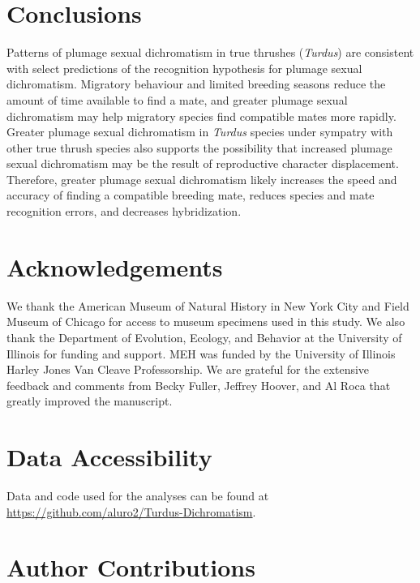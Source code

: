 \documentclass[
  a4paper,
]{article}
\begin{document}
\hypertarget{conclusions}{%
\section{Conclusions}\label{conclusions}}

Patterns of plumage sexual dichromatism in true thrushes (\emph{Turdus})
are consistent with select predictions of the recognition hypothesis for
plumage sexual dichromatism. Migratory behaviour and limited breeding
seasons reduce the amount of time available to find a mate, and greater
plumage sexual dichromatism may help migratory species find compatible
mates more rapidly. Greater plumage sexual dichromatism in \emph{Turdus}
species under sympatry with other true thrush species also supports the
possibility that increased plumage sexual dichromatism may be the result
of reproductive character displacement. Therefore, greater plumage
sexual dichromatism likely increases the speed and accuracy of finding a
compatible breeding mate, reduces species and mate recognition errors,
and decreases hybridization.

\hypertarget{acknowledgements}{%
\section{Acknowledgements}\label{acknowledgements}}

We thank the American Museum of Natural History in New York City and
Field Museum of Chicago for access to museum specimens used in this
study. We also thank the Department of Evolution, Ecology, and Behavior
at the University of Illinois for funding and support. MEH was funded by
the University of Illinois Harley Jones Van Cleave Professorship. We are
grateful for the extensive feedback and comments from Becky Fuller,
Jeffrey Hoover, and Al Roca that greatly improved the manuscript.

\hypertarget{data-accessibility}{%
\section{Data Accessibility}\label{data-accessibility}}

Data and code used for the analyses can be found at
\url{https://github.com/aluro2/Turdus-Dichromatism}.

\hypertarget{author-contributions}{%
\section{Author Contributions}\label{author-contributions}}
\end{document}
